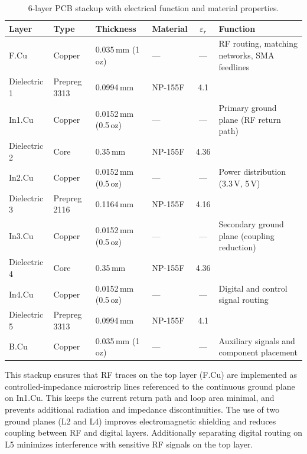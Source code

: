 \begin{table}[H]
    \centering
    \caption{6-layer PCB stackup with electrical function and material properties.}
    \label{tab:rf_stackup_functional}
    \small
    \renewcommand{\arraystretch}{1.2}
    \begin{tabularx}{\textwidth}{l l l l c X}
        \toprule
        \textbf{Layer} & \textbf{Type} & \textbf{Thickness} & \textbf{Material} & \textbf{$\varepsilon_r$} & \textbf{Function} \\
        \midrule
        F.Cu   & Copper       & 0.035\,mm (1\,oz)   & ---     & ---  & RF routing, matching networks, SMA feedlines \\
        Dielectric 1 & Prepreg 3313 & 0.0994\,mm & NP-155F & 4.1  &  \\
        In1.Cu & Copper       & 0.0152\,mm (0.5\,oz)& ---     & ---  & Primary ground plane (RF return path) \\
        Dielectric 2 & Core   & 0.35\,mm            & NP-155F & 4.36 &  \\
        In2.Cu & Copper       & 0.0152\,mm (0.5\,oz)& ---     & ---  & Power distribution (3.3\,V, 5\,V) \\
        Dielectric 3 & Prepreg 2116 & 0.1164\,mm & NP-155F & 4.16 &  \\
        In3.Cu & Copper       & 0.0152\,mm (0.5\,oz)& ---     & ---  & Secondary ground plane (coupling reduction) \\
        Dielectric 4 & Core   & 0.35\,mm            & NP-155F & 4.36 &  \\
        In4.Cu & Copper       & 0.0152\,mm (0.5\,oz)& ---     & ---  & Digital and control signal routing \\
        Dielectric 5 & Prepreg 3313 & 0.0994\,mm & NP-155F & 4.1  &  \\
        B.Cu   & Copper       & 0.035\,mm (1\,oz)   & ---     & ---  & Auxiliary signals and component placement \\
        \bottomrule
    \end{tabularx}
\end{table}

This stackup ensures that RF traces on the top layer (F.Cu) are implemented as controlled-impedance microstrip lines referenced to the continuous ground plane on In1.Cu. This keeps the current return path and loop area minimal, and prevents additional radiation and impedance discontinuities.
The use of two ground planes (L2 and L4) improves electromagnetic shielding and reduces coupling between RF and digital layers. Additionally separating digital routing on L5 minimizes interference with sensitive RF signals on the top layer.

